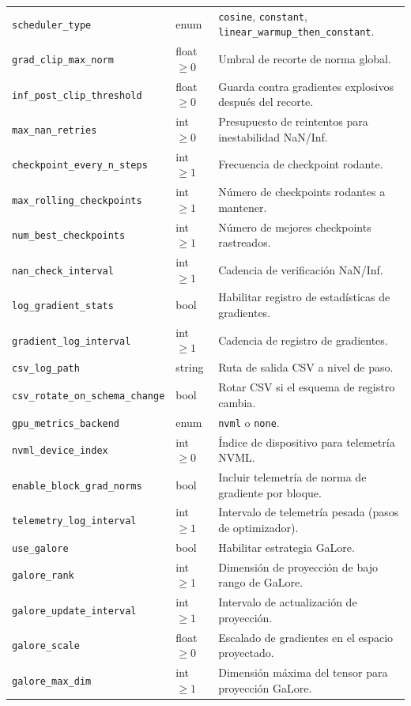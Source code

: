 \documentclass[11pt,a4paper]{article}
\begin{document}
\begin{longtable}{p{5.1cm}p{2.4cm}p{7.0cm}}
\texttt{scheduler\_type} & enum & \texttt{cosine}, \texttt{constant}, \texttt{linear\_warmup\_then\_constant}. \\
\texttt{grad\_clip\_max\_norm} & float $\ge 0$ & Umbral de recorte de norma global. \\
\texttt{inf\_post\_clip\_threshold} & float $\ge 0$ & Guarda contra gradientes explosivos después del recorte. \\
\texttt{max\_nan\_retries} & int $\ge 0$ & Presupuesto de reintentos para inestabilidad NaN/Inf. \\
\texttt{checkpoint\_every\_n\_steps} & int $\ge 1$ & Frecuencia de checkpoint rodante. \\
\texttt{max\_rolling\_checkpoints} & int $\ge 1$ & Número de checkpoints rodantes a mantener. \\
\texttt{num\_best\_checkpoints} & int $\ge 1$ & Número de mejores checkpoints rastreados. \\
\texttt{nan\_check\_interval} & int $\ge 1$ & Cadencia de verificación NaN/Inf. \\
\texttt{log\_gradient\_stats} & bool & Habilitar registro de estadísticas de gradientes. \\
\texttt{gradient\_log\_interval} & int $\ge 1$ & Cadencia de registro de gradientes. \\
\texttt{csv\_log\_path} & string & Ruta de salida CSV a nivel de paso. \\
\texttt{csv\_rotate\_on\_schema\_change} & bool & Rotar CSV si el esquema de registro cambia. \\
\texttt{gpu\_metrics\_backend} & enum & \texttt{nvml} o \texttt{none}. \\
\texttt{nvml\_device\_index} & int $\ge 0$ & Índice de dispositivo para telemetría NVML. \\
\texttt{enable\_block\_grad\_norms} & bool & Incluir telemetría de norma de gradiente por bloque. \\
\texttt{telemetry\_log\_interval} & int $\ge 1$ & Intervalo de telemetría pesada (pasos de optimizador). \\
\texttt{use\_galore} & bool & Habilitar estrategia GaLore. \\
\texttt{galore\_rank} & int $\ge 1$ & Dimensión de proyección de bajo rango de GaLore. \\
\texttt{galore\_update\_interval} & int $\ge 1$ & Intervalo de actualización de proyección. \\
\texttt{galore\_scale} & float $\ge 0$ & Escalado de gradientes en el espacio proyectado. \\
\texttt{galore\_max\_dim} & int $\ge 1$ & Dimensión máxima del tensor para proyección GaLore. \\
\bottomrule
\end{longtable}
\normalsize
\end{document}

